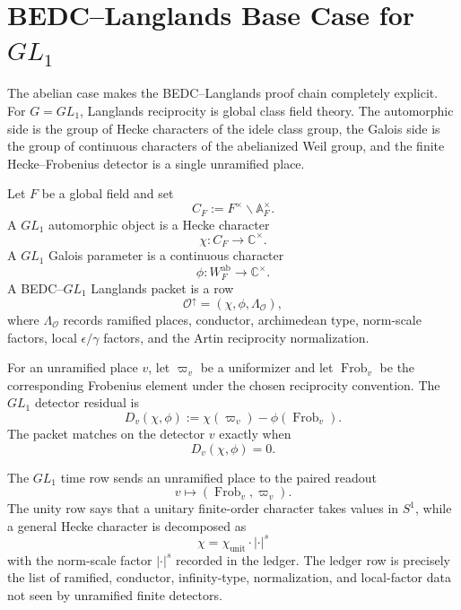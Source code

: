 \section{BEDC--Langlands Base Case for \texorpdfstring{$GL_1$}{GL1}}
\label{sec:unified-reality-bedc-langlands-gl1-base-case}

The abelian case makes the BEDC--Langlands proof chain completely
explicit. For $G=GL_1$, Langlands reciprocity is global class field
theory. The automorphic side is the group of Hecke characters of the
idele class group, the Galois side is the group of continuous characters
of the abelianized Weil group, and the finite Hecke--Frobenius detector
is a single unramified place.

\begin{definition}
\label{def:unified-reality-gl1-langlands-packet}
Let $F$ be a global field and set
$$
C_F:=F^{\times}\backslash\mathbb A_F^{\times}.
$$
A $GL_1$ automorphic object is a Hecke character
$$
\chi:C_F\to\mathbb C^{\times}.
$$
A $GL_1$ Galois parameter is a continuous character
$$
\phi:W_F^{\mathrm{ab}}\to\mathbb C^{\times}.
$$
A BEDC--$GL_1$ Langlands packet is a row
$$
\mathcal O^{\uparrow}=(\chi,\phi,\Lambda_{\mathcal O}),
$$
where $\Lambda_{\mathcal O}$ records ramified places, conductor,
archimedean type, norm-scale factors, local $\epsilon/\gamma$ factors,
and the Artin reciprocity normalization.
\end{definition}

\begin{definition}
\label{def:unified-reality-gl1-detector-residual}
For an unramified place $v$, let $\varpi_v$ be a uniformizer and let
$\operatorname{Frob}_v$ be the corresponding Frobenius element under the
chosen reciprocity convention. The $GL_1$ detector residual is
$$
D_v(\chi,\phi)
:=
\chi(\varpi_v)-\phi(\operatorname{Frob}_v).
$$
The packet matches on the detector $v$ exactly when
$$
D_v(\chi,\phi)=0.
$$
\end{definition}

\begin{definition}
\label{def:unified-reality-gl1-three-properties}
The $GL_1$ time row sends an unramified place to the paired readout
$$
v\longmapsto(\operatorname{Frob}_v,\varpi_v).
$$
The unity row says that a unitary finite-order character takes values in
$S^1$, while a general Hecke character is decomposed as
$$
\chi=\chi_{\mathrm{unit}}\cdot|\cdot|^s
$$
with the norm-scale factor $|\cdot|^s$ recorded in the ledger. The
ledger row is precisely the list of ramified, conductor, infinity-type,
normalization, and local-factor data not seen by unramified finite
detectors.
\end{definition}

